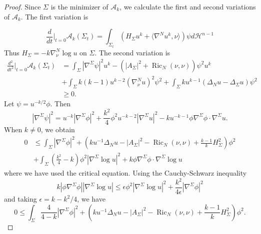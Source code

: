 \documentclass[11pt,letterpaper]{amsart}
\DeclareMathOperator{\Ric}{Ric}
\newcommand{\lp}{\langle}
\newcommand{\rp}{\rangle}
\newcommand{\mA}{\mathcal{A}}
\newcommand{\mH}{\mathcal{H}}
\theoremstyle{definition}
\theoremstyle{remark}
\numberwithin{equation}{section}
\begin{document}
\begin{proof}
    Since $\Sigma$ is the minimizer of $\mA_{k}$, we calculate the first and second variations of $\mA_{k}.$ The first variation is
  
       \begin{equation*}
        \frac{d}{d t}\bigg|_{t=0}\mA_{k}(\Sigma_t)=\int_{\Sigma_t}\left(H_\Sigma u^k+\lp\nabla^{N}u^k,\nu\rp\right)\psi d\mH^{n-1}
    \end{equation*}
    Thus $H_\Sigma=-k \nabla^N_\nu\log u$ on $\Sigma$. 
    The second variation is \begin{equation*}
        \begin{split}
            \frac{d^2}{d t^2}\bigg|_{t=0}\mA_{k}(\Sigma_t)&=\int_{\Sigma}|\nabla^{\Sigma}\psi|^2 u^k-\left(|A_{\Sigma}|^2+\Ric_N(\nu,\nu)\right)\psi^2 u^k\\
            &+\int_\Sigma k(k-1)u^{k-2}\left(\nabla^N_{\nu}u\right)^2\psi^2 +\int_{\Sigma}ku^{k-1}\left(\Delta_N u-\Delta_{\Sigma} u\right)\psi^2\\
            &\geq 0.
        \end{split}
    \end{equation*}
    Let $\psi=u^{-k/2}\phi$. 
    Then
    \[|\nabla^{\Sigma}\psi|^2 =u^{-k}|\nabla^\Sigma\phi|^2+\frac{k^2}{4}\phi^2u^{-k-2}|\nabla^\Sigma u|^2-ku^{-k-1}\phi\nabla^\Sigma\phi\cdot\nabla^\Sigma u.\]
    When $k\neq 0$, we obtain
    \begin{equation}\label{A_k-stability inequality}
    \begin{split}
        0&\leq \int_\Sigma |\nabla^\Sigma \phi|^2+(ku^{-1}\Delta_N u-|A_\Sigma|^2-\Ric_N(\nu,\nu)+\frac{k-1}{k}H_{\Sigma}^2)\phi^2\\
        & +\int_\Sigma (\frac{k^2}{4}-k)\phi^2|\nabla^\Sigma \log u|^2+k\phi\nabla^\Sigma\phi\cdot\nabla^\Sigma\log u
    \end{split}
    \end{equation}
    where we have used the critical equation. Using the Cauchy-Schwarz inequality
    \[k|\phi \nabla^\Sigma\phi||\nabla^\Sigma\log u|\leq \epsilon \phi^2|\nabla^\Sigma \log u|^2+\frac{k^2}{4\epsilon}|\nabla^\Sigma \phi|^2\]
    and taking $\epsilon=k-k^2/4$, we have
    \[0\leq \int_\Sigma \frac{4}{4-k}|\nabla^\Sigma\phi|^2+(ku^{-1}\Delta_N u-|A_\Sigma|^2-\Ric_N(\nu,\nu)+\frac{k-1}{k}H_{\Sigma}^2)\phi^2.\]
    

\end{proof}
\end{document}
